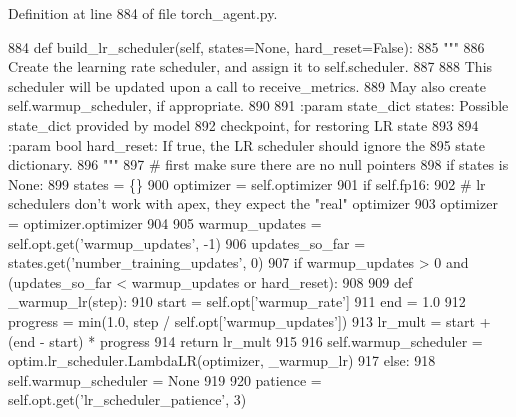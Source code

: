 Definition at line 884 of file torch\+\_\+agent.\+py.


\begin{DoxyCode}
884     \textcolor{keyword}{def }build\_lr\_scheduler(self, states=None, hard\_reset=False):
885         \textcolor{stringliteral}{"""}
886 \textcolor{stringliteral}{        Create the learning rate scheduler, and assign it to self.scheduler.}
887 \textcolor{stringliteral}{}
888 \textcolor{stringliteral}{        This scheduler will be updated upon a call to receive\_metrics.}
889 \textcolor{stringliteral}{        May also create self.warmup\_scheduler, if appropriate.}
890 \textcolor{stringliteral}{}
891 \textcolor{stringliteral}{        :param state\_dict states: Possible state\_dict provided by model}
892 \textcolor{stringliteral}{            checkpoint, for restoring LR state}
893 \textcolor{stringliteral}{}
894 \textcolor{stringliteral}{        :param bool hard\_reset: If true, the LR scheduler should ignore the}
895 \textcolor{stringliteral}{            state dictionary.}
896 \textcolor{stringliteral}{        """}
897         \textcolor{comment}{# first make sure there are no null pointers}
898         \textcolor{keywordflow}{if} states \textcolor{keywordflow}{is} \textcolor{keywordtype}{None}:
899             states = \{\}
900         optimizer = self.optimizer
901         \textcolor{keywordflow}{if} self.fp16:
902             \textcolor{comment}{# lr schedulers don't work with apex, they expect the "real" optimizer}
903             optimizer = optimizer.optimizer
904 
905         warmup\_updates = self.opt.get(\textcolor{stringliteral}{'warmup\_updates'}, -1)
906         updates\_so\_far = states.get(\textcolor{stringliteral}{'number\_training\_updates'}, 0)
907         \textcolor{keywordflow}{if} warmup\_updates > 0 \textcolor{keywordflow}{and} (updates\_so\_far < warmup\_updates \textcolor{keywordflow}{or} hard\_reset):
908 
909             \textcolor{keyword}{def }\_warmup\_lr(step):
910                 start = self.opt[\textcolor{stringliteral}{'warmup\_rate'}]
911                 end = 1.0
912                 progress = min(1.0, step / self.opt[\textcolor{stringliteral}{'warmup\_updates'}])
913                 lr\_mult = start + (end - start) * progress
914                 \textcolor{keywordflow}{return} lr\_mult
915 
916             self.warmup\_scheduler = optim.lr\_scheduler.LambdaLR(optimizer, \_warmup\_lr)
917         \textcolor{keywordflow}{else}:
918             self.warmup\_scheduler = \textcolor{keywordtype}{None}
919 
920         patience = self.opt.get(\textcolor{stringliteral}{'lr\_scheduler\_patience'}, 3)

\end{DoxyCode}
